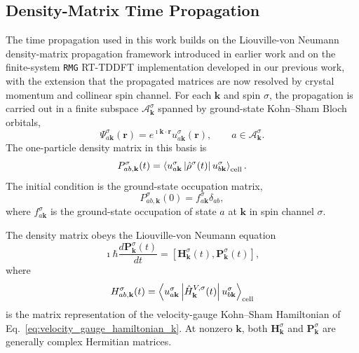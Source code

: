 \subsection{Density-Matrix Time Propagation}
\label{sec:density-matrix-propagation}

The time propagation used in this work builds on the Liouville-von
Neumann density-matrix propagation framework introduced in earlier
work\cite{lvnmd} and on the finite-system \texttt{RMG} RT-TDDFT
implementation developed in our previous
work,\cite{jakowski-rmg-tddft-2025} with the extension that the
propagated matrices are now resolved by crystal momentum and collinear
spin channel.  For each $\mathbf k$ and spin $\sigma$, the propagation
is carried out in a finite subspace
$\mathcal A_{\mathbf k}^{\sigma}$ spanned by ground-state Kohn--Sham
Bloch orbitals,
\begin{equation}
  \Psi_{a\mathbf k}^{\sigma}(\mathbf r)
  =
  e^{\imath\mathbf k\cdot\mathbf r}
  u_{a\mathbf k}^{\sigma}(\mathbf r),
  \qquad
  a\in\mathcal A_{\mathbf k}^{\sigma}.
  \label{eq:tddft_active_bloch_basis}
\end{equation}
The one-particle density matrix in this basis is
\begin{equation}
  P_{ab,\mathbf k}^{\sigma}(t)
  =
  \left\langle
    u_{a\mathbf k}^{\sigma}
    \left|
    \hat\rho^{\sigma}(t)
    \right|
    u_{b\mathbf k}^{\sigma}
  \right\rangle_{\rm cell}.
  \label{eq:density_matrix_definition_kspin}
\end{equation}
The initial condition is the ground-state occupation matrix,
\begin{equation}
  P_{ab,\mathbf k}^{\sigma}(0)
  =
  f_{a\mathbf k}^{\sigma}\delta_{ab},
  \label{eq:initial_density_matrix_kspin}
\end{equation}
where $f_{a\mathbf k}^{\sigma}$ is the ground-state occupation of state
$a$ at $\mathbf k$ in spin channel $\sigma$.

The density matrix obeys the Liouville-von Neumann equation
\begin{equation}
  \imath\hbar
  \frac{d\mathbf P_{\mathbf k}^{\sigma}(t)}{dt}
  =
  \left[
    \mathbf H_{\mathbf k}^{\sigma}(t),
    \mathbf P_{\mathbf k}^{\sigma}(t)
  \right],
  \label{eq:lvn_kspin}
\end{equation}
where
\begin{equation}
  H_{ab,\mathbf k}^{\sigma}(t)
  =
  \left\langle
    u_{a\mathbf k}^{\sigma}
    \left|
    \hat H_{\mathbf k}^{V,\sigma}(t)
    \right|
    u_{b\mathbf k}^{\sigma}
  \right\rangle_{\rm cell}
  \label{eq:hamiltonian_matrix_kspin}
\end{equation}
is the matrix representation of the velocity-gauge Kohn--Sham
Hamiltonian of Eq.~\eqref{eq:velocity_gauge_hamiltonian_k}.  At
nonzero $\mathbf k$, both $\mathbf H_{\mathbf k}^{\sigma}$ and
$\mathbf P_{\mathbf k}^{\sigma}$ are generally complex Hermitian
matrices.


